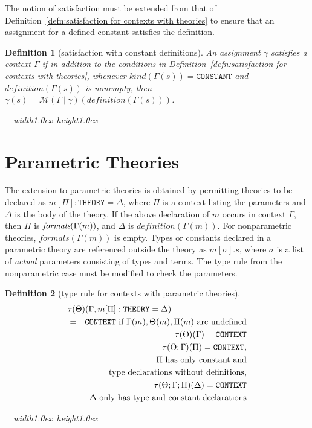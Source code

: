 \documentclass [12pt,twoside]{cslreport}
\newcommand{\thmbox}
   {{\ \hfill\hbox{%
      \vrule width1.0ex height1.0ex
   }\parfillskip 0pt }}
\newcommand{\Mgamma}[1]{{\mathcal M}(\Gamma\vbar\gamma)(#1)}
\newcommand{\ttcontext}{\mathtt{CONTEXT}}
\newcommand{\ttconstant}{\mathtt{CONSTANT}}
\newcommand{\tttheory}{\mathtt{THEORY}}
\newcommand{\itdef}{\textit{definition}}
\newcommand{\vbar}{\ |\ }
\newtheorem{definition}{Definition}
\newenvironment{Defn}[1]{\begin{definition}[#1]\label{defn:#1}}{
\thmbox\end{definition}}
\begin{document}
The notion of satisfaction must be extended from that of
Definition~\ref{defn:satisfaction for contexts with theories} to ensure
that an 
assignment 
for a defined constant satisfies the definition.
\begin{Defn}{satisfaction with constant definitions}
An assignment $\gamma$ satisfies a context $\Gamma$ if
in addition to the conditions in
Definition~\ref{defn:satisfaction for contexts with theories}, whenever $
\textit{kind}(\Gamma(s)) = \ttconstant$ and 
$\textit{definition}(\Gamma(s))$ is nonempty, then
$\gamma(s) = \Mgamma{ \textit{definition}(\Gamma(s))}$.
\end{Defn}


\section{Parametric Theories}

The extension to parametric theories is obtained by permitting
theories to be declared as $ m[\Pi] : \tttheory{} = \Delta$,
where $\Pi$ is a context listing the parameters and $\Delta$ is
the body of the theory.  If the above declaration of $m$ occurs
in context $\Gamma$, then $\Pi$ is $ \emph{formals}(\Gamma(m))$, and
$\Delta$ is $ \itdef{}(\Gamma(m))$.
For nonparametric theories, $ \mathit{formals}(\Gamma(m))$
is empty.   
Types or constants declared in a parametric theory are
referenced outside the theory as $m[\sigma].s$, where $\sigma$
is a list of \emph{actual} parameters consisting of types and terms.  
The type rule from the nonparametric case
must be modified to check the parameters.
\begin{Defn}{type rule for contexts with parametric theories}
\begin{eqnarray*}
  \lefteqn{\tau(\Theta)(\Gamma, m[\Pi] : \tttheory{} = \Delta)}\\ & = & \ttcontext
     \mbox{ if } \Gamma(m), \Theta(m), \Pi(m) \mbox{ are undefined}\\& &
      \tau(\Theta)(\Gamma) = \ttcontext\\& &
      \tau(\Theta ; \Gamma)(\Pi)  = \ttcontext,  \\ & & 
      \Pi \mbox{ has only constant and}\\& & \mbox{type declarations
without definitions,}\\ & &
      \tau(\Theta ; \Gamma ; \Pi)(\Delta)  = \ttcontext \\& &
      \mbox{ $\Delta$ only has type and constant declarations}
\end{eqnarray*}
\end{Defn}
\end{document}

